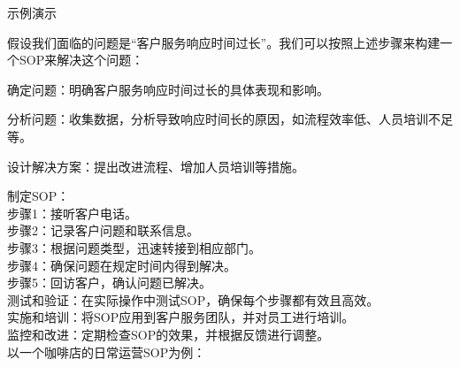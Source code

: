 \documentclass[12pt]{book}
\begin{document}
示例演示

假设我们面临的问题是“客户服务响应时间过长”。我们可以按照上述步骤来构建一个SOP来解决这个问题：

确定问题：明确客户服务响应时间过长的具体表现和影响。

分析问题：收集数据，分析导致响应时间长的原因，如流程效率低、人员培训不足等。

设计解决方案：提出改进流程、增加人员培训等措施。

制定SOP：\\
步骤1：接听客户电话。\\
步骤2：记录客户问题和联系信息。\\
步骤3：根据问题类型，迅速转接到相应部门。\\
步骤4：确保问题在规定时间内得到解决。\\
步骤5：回访客户，确认问题已解决。\\
测试和验证：在实际操作中测试SOP，确保每个步骤都有效且高效。\\
实施和培训：将SOP应用到客户服务团队，并对员工进行培训。\\
监控和改进：定期检查SOP的效果，并根据反馈进行调整。\\



以一个咖啡店的日常运营SOP为例：\\
\end{document}
